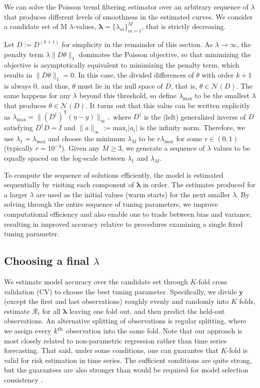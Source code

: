 \documentclass[10pt,letterpaper]{article}
\newcommand{\lr}[1]{\left(#1\right)}
\newcommand{\snorm}[1]{\lVert #1 \rVert}
\def\bfy{\mathbf{y}}
\def\calR{\mathcal{R}}
\renewcommand{\top}{\mathsf{T}}
\def\th{^{\textnormal{th}}}
\begin{document}
We can solve the Poisson trend filtering estimator over an arbitrary sequence of 
$\lambda$ that produces different levels of smoothness in the estimated curves. 
We consider a candidate set of M $\lambda$-values, $\boldsymbol{\lambda} = \{\lambda_m\}_{m=1}^M$,
that is strictly decreasing.


Let $D := D^{(k+1)}$ for simplicity in the remainder of this section. As
$\lambda \to\infty$, the penalty term $\lambda \snorm{D\theta}_1$ dominates the
Poisson objective, so that minimizing the objective is asymptotically equivalent
to minimizing the penalty term, which results in $\snorm{D\theta}_1 = 0$. In
this case, the divided differences of $\theta$ with order $k+1$ is always $0$,
and thus, $\theta$ must lie in the null space of $D$, that is,
$\theta\in\mathcal{N}(D)$. The same happens for any $\lambda$ beyond this
threshold, so define $\lambda_{\textrm{max}}$ to be the smallest $\lambda$ that
produces $\theta\in\mathcal{N}(D)$. It turns out that this value can be written
explicitly as $\lambda_{\textrm{max}} = \snorm{\lr{D^{\dagger}}^{\top} \lr{\eta
- y}}_{\infty},$ where $D^{\dagger}$ is the (left) generalized inverse of $D$
satisfying $D^{\dagger} D = I$ and $\snorm{a}_{\infty} :=
\mathrm{max}_{i}|a_i|$ is the infinity norm. Therefore, we use
$\lambda_1 = \lambda_{\max}$ and choose the minimum $\lambda_M$ to
be $r\lambda_{\max}$ for some $r \in (0,1)$ (typically $r=10^{-4}$). Given any
$M\geq 3$, we generate a sequence of $\lambda$ values to be equally spaced on
the log-scale between $\lambda_1$ and $\lambda_M$. 

To compute the sequence of solutions efficiently, the model is estimated
sequentially by visiting each component of $\boldsymbol{\lambda}$ in order. The
estimates produced for a larger $\lambda$ are used as the initial values (warm
starts) for the next smaller $\lambda$. By solving through the entire sequence
of tuning parameters, we improve computational efficiency and also enable one to
trade between bias and variance, resulting in improved accuracy relative to
procedures examining a single fixed tuning parameter.


\subsection{Choosing a final $\lambda$}
\label{sec:cv}

We estimate model accuracy over the candidate set through $K$-fold cross
validation (CV) to choose the best tuning parameter. Specifically, we divide
$\bfy$ (except the first and last observations) roughly evenly and randomly into
$K$ folds, estimate $\calR_t$ for all $\boldsymbol{\lambda}$ leaving one fold
out, and then predict the held-out observations. 
An alternative splitting of observations is regular splitting, where we assign every
$k\th$ observation into the same fold. Note that our approach is most closely
related to non-parametric regression rather than time series forecasting. That
said, under some conditions, one can guarantee that $K$-fold is valid for risk
estimation in time series. The sufficient conditions are quite strong, but the
guarantees are also stronger than would be required for model selection
consistency \cite{BERGMEIR201870}. 
\end{document}
